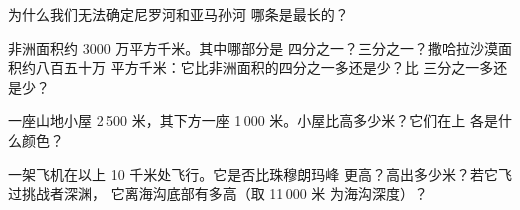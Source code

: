 \begin{exercise}[$\star\star$]\label{exo:g4:world-physical-map:8}
为什么我们无法确定尼罗河和亚马孙河
哪条是最长的？
\end{exercise}

\begin{exercise}[$\star\star$]\label{exo:g4:world-physical-map:9}
非洲面积约 3000 万平方千米。其中哪部分是
四分之一？三分之一？撒哈拉沙漠面积约八百五十万
平方千米：它比非洲面积的四分之一多还是少？比
三分之一多还是少？
\end{exercise}

\begin{exercise}[$\star\star$]\label{exo:g4:world-physical-map:10}
一座山地小屋 2\,500 米，其下方一座 1\,000
米。小屋比高多少米？它们在上
各是什么颜色？
\end{exercise}

\begin{exercise}[$\star\star\star$]\label{exo:g4:world-physical-map:11}
一架飞机在以上 10 千米处飞行。它是否比珠穆朗玛峰
更高？高出多少米？若它飞过挑战者深渊，
它离海沟底部有多高（取 11\,000 米
为海沟深度）？
\end{exercise}

